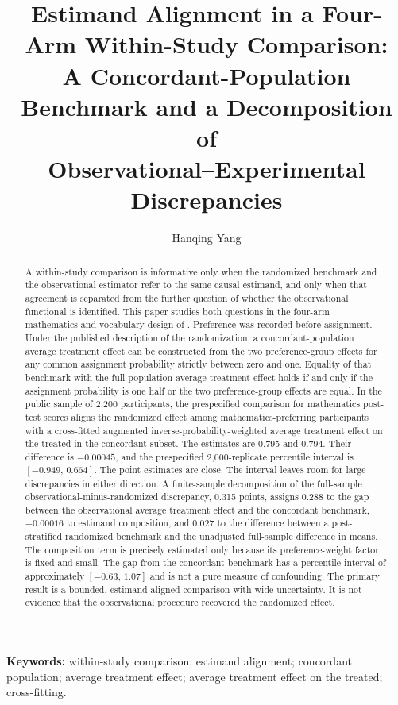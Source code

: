 \documentclass[11pt]{article}
\title{Estimand Alignment in a Four-Arm Within-Study Comparison:\\
A Concordant-Population Benchmark and a Decomposition of\\
Observational--Experimental Discrepancies}
\author{Hanqing Yang}
\date{}
\theoremstyle{remark}
\begin{document}
\maketitle

\begin{abstract}
A within-study comparison is informative only when the randomized benchmark and the observational estimator refer to the same causal estimand, and only when that agreement is separated from the further question of whether the observational functional is identified. This paper studies both questions in the four-arm mathematics-and-vocabulary design of \citet{keller2025}. Preference was recorded before assignment. Under the published description of the randomization, a concordant-population average treatment effect can be constructed from the two preference-group effects for any common assignment probability strictly between zero and one. Equality of that benchmark with the full-population average treatment effect holds if and only if the assignment probability is one half or the two preference-group effects are equal. In the public sample of 2{,}200 participants, the prespecified comparison for mathematics post-test scores aligns the randomized effect among mathematics-preferring participants with a cross-fitted augmented inverse-probability-weighted average treatment effect on the treated in the concordant subset. The estimates are 0.795 and 0.794. Their difference is $-0.00045$, and the prespecified 2{,}000-replicate percentile interval is $[-0.949,\,0.664]$. The point estimates are close. The interval leaves room for large discrepancies in either direction. A finite-sample decomposition of the full-sample observational-minus-randomized discrepancy, 0.315 points, assigns 0.288 to the gap between the observational average treatment effect and the concordant benchmark, $-0.00016$ to estimand composition, and 0.027 to the difference between a post-stratified randomized benchmark and the unadjusted full-sample difference in means. The composition term is precisely estimated only because its preference-weight factor is fixed and small. The gap from the concordant benchmark has a percentile interval of approximately $[-0.63,\,1.07]$ and is not a pure measure of confounding. The primary result is a bounded, estimand-aligned comparison with wide uncertainty. It is not evidence that the observational procedure recovered the randomized effect.
\end{abstract}

\noindent\textbf{Keywords:} within-study comparison; estimand alignment; concordant population; average treatment effect; average treatment effect on the treated; cross-fitting.
\end{document}
